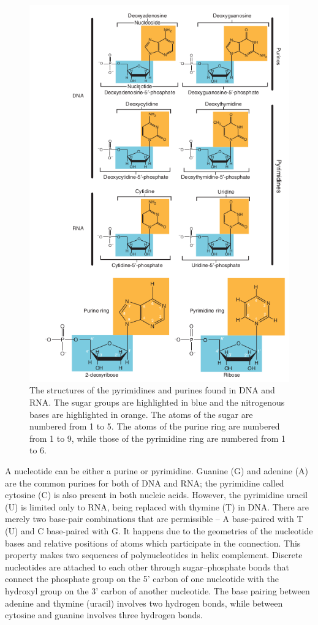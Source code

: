 \begin{figure}[!ht]
	\centering
	\includegraphics[width=.9\textwidth]{figures/bases}
	\caption{The structures of the pyrimidines and purines found in DNA and RNA. The sugar groups are highlighted in blue and the nitrogenous bases are highlighted in orange. 
	The atoms of the sugar are numbered from 1 to 5. The atoms of the purine ring are numbered from 1 to 9, 
	while those of the pyrimidine ring are numbered from 1 to 6. \label{o:latex_friendly_zone}}
\end{figure}

A nucleotide can be either a purine or pyrimidine. Guanine (G) and adenine (A) are the common purines for both of DNA and RNA; 
the pyrimidine called cytosine (C) is also present in both nucleic acids. However, the pyrimidine uracil (U) is limited only to RNA, 
being replaced with thymine (T) in DNA. There are merely two base-pair combinations that are permissible – A base-paired with T (U) and C base-paired with G. 
It happens due to the geometries of the nucleotide bases and relative positions of atoms which participate in the connection. 
This property makes two sequences of polynucleotides in helix complement. Discrete nucleotides are attached to each other through sugar–phosphate bonds 
that connect the phosphate group on the 5’ carbon of one nucleotide with the hydroxyl group on the 3’ carbon of another nucleotide. 
The base pairing between adenine and thymine (uracil) involves two hydrogen bonds, while between cytosine and guanine involves three hydrogen bonds.
